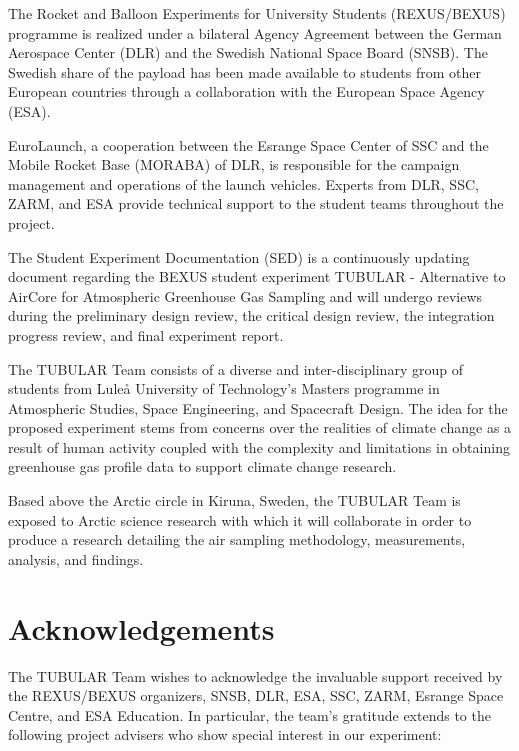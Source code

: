 \documentclass[a4paper,12pt,twoside]{article}
\begin{document}
The Rocket and Balloon Experiments for University Students (REXUS/BEXUS) programme is realized under a bilateral Agency Agreement between the German Aerospace Center (DLR) and the Swedish National Space Board (SNSB). The Swedish share of the
payload has been made available to students from other European countries through a collaboration with the European Space Agency (ESA).

EuroLaunch, a cooperation between the Esrange Space Center of SSC and the Mobile Rocket Base (MORABA) of DLR, is responsible for the campaign management and operations of the launch vehicles. Experts from DLR, SSC, ZARM, and ESA provide
technical support to the student teams throughout the project.

The Student Experiment Documentation (SED) is a continuously updating document regarding the BEXUS student experiment TUBULAR - Alternative to AirCore for Atmospheric Greenhouse Gas Sampling and will undergo reviews during the preliminary design review, the critical design review, the integration progress review, and final experiment report.

The TUBULAR Team consists of a diverse and inter-disciplinary group of students from Luleå University of Technology's Masters programme in Atmospheric Studies, Space Engineering, and Spacecraft Design. The idea for the proposed experiment stems from concerns over the realities of climate change as a result of human activity coupled with the complexity and limitations in obtaining greenhouse gas profile data to support climate change research.

Based above the Arctic circle in Kiruna, Sweden, the TUBULAR Team is exposed to Arctic science research with which it will collaborate in order to produce a research detailing the air sampling methodology, measurements, analysis, and findings.



\newpage
\section*{Acknowledgements} \markboth{}{}

The TUBULAR Team wishes to acknowledge the invaluable support received by the REXUS/BEXUS organizers, SNSB, DLR, ESA, SSC, ZARM, Esrange Space Centre, and ESA Education. In particular, the team's gratitude extends to the following project advisers who show special interest in our experiment:
\end{document}
